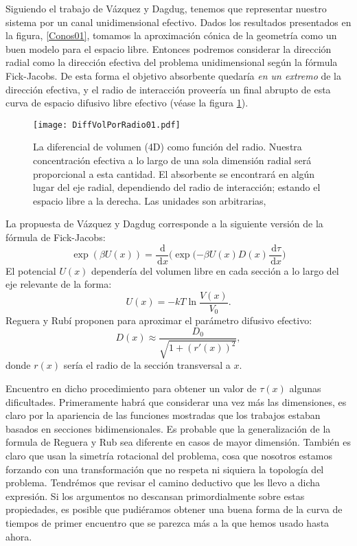 \documentclass[letterpaperr,12pt]{article}
\newcommand{\rd}{\, \mathrm{d}}
\begin{document}
Siguiendo el trabajo de Vázquez y Dagdug, tenemos que representar
nuestro sistema por un canal unidimensional efectivo. Dados los resultados presentados
en la figura, \ref{Conos01}, tomamos la aproximación cónica de la geometría como
un buen modelo para el espacio libre. Entonces podremos
considerar la dirección radial como la dirección efectiva del problema
unidimensional según la fórmula Fick-Jacobs. De esta forma el 
objetivo absorbente quedaría  \emph{en un extremo} de la dirección efectiva,
y el radio de interacción proveería un final abrupto de esta curva
de espacio difusivo libre efectivo (véase la figura \ref{VolRadial}).

\begin{figure}[h]
  \centering
   \texttt{[image: DiffVolPorRadio01.pdf]}
   \caption{La diferencial de volumen (4D) como función del radio. Nuestra
concentración efectiva a lo largo de 
una sola dimensión radial 
será proporcional a esta cantidad. 
El absorbente se encontrará en algún lugar del eje radial, dependiendo
del radio de interacción; estando
el espacio libre a la derecha. Las unidades son arbitrarias,
 }\label{VolRadial}
\end{figure}

La propuesta de Vázquez y Dagdug corresponde a la siguiente versión
de la fórmula de Fick-Jacobs:
\begin{equation}
\exp(\beta U(x))=
\frac{\rd}{\rd x}\biggl( 
\exp(-\beta U(x) D(x) \frac{\rd \tau}{\rd x}
\biggr)
\end{equation}
El potencial $U(x)$ dependería del volumen libre en cada sección
a lo largo del eje relevante de la forma:
\begin{equation}
U(x)=-kT \ln \frac{V(x)}{V_0}.
\end{equation}
Reguera y Rubí \cite{RR} proponen para aproximar el parámetro difusivo 
efectivo:
\begin{equation}
D(x)\approx \frac{D_0}{\sqrt{1+(r'(x))^2}},
\end{equation}
donde $r(x)$ sería el radio de la sección transversal a $x$.

Encuentro en dicho procedimiento para obtener un valor de $\tau(x)$
algunas dificultades. Primeramente habrá que considerar una vez más las
dimensiones, es claro por la apariencia de las funciones mostradas
que los trabajos estaban basados en secciones bidimensionales. Es
probable que la generalización de la formula de Reguera y Rub sea
diferente en casos de mayor dimensión. También es claro 
que usan la simetría rotacional del problema, cosa que nosotros
estamos forzando con una transformación que no respeta ni siquiera
la topología del problema. Tendrémos que revisar el camino deductivo
que les llevo a dicha expresión. Si los argumentos no descansan
primordialmente sobre estas propiedades, es posible que
pudiéramos obtener una buena forma de la curva de tiempos de
primer encuentro que se parezca más a la que hemos usado hasta ahora.


\end{document}
